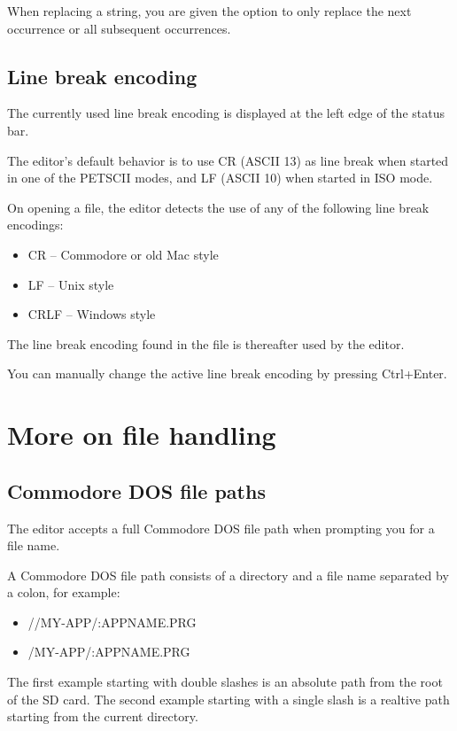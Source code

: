 \documentclass{article}
\begin{document}
        When replacing a string, you are given the option to only replace the
        next occurrence or all subsequent occurrences.

    \subsection{Line break encoding}
        The currently used line break encoding is displayed at the left edge of the status bar.

        The editor's default behavior is to use CR (ASCII 13) as line break when started in
        one of the PETSCII modes, and LF (ASCII 10) when started in ISO mode.

        On opening a file, the editor detects the use of any of the following line break encodings:

        \begin{itemize}
            \item CR -- Commodore or old Mac style
            \item LF -- Unix style
            \item CRLF -- Windows style
        \end{itemize}

        The line break encoding found in the file is thereafter used by the editor.

        You can manually change the active line break encoding by pressing Ctrl+Enter.

\section{More on file handling}
    \subsection{Commodore DOS file paths}
    The editor accepts a full Commodore DOS file path when prompting you for a file name.

    A Commodore DOS file path consists of a directory and a file name separated by a colon, for
    example:

    \begin{itemize}
        \item //MY-APP/:APPNAME.PRG
        \item /MY-APP/:APPNAME.PRG
    \end{itemize}
    
    The first example starting with double slashes is an absolute path from the root of the SD card. The second
    example starting with a single slash is a realtive path starting from the current directory.
\end{document}
